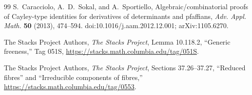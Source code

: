 \begin{thebibliography}{99}
S.~Caracciolo, A.~D.~Sokal, and A.~Sportiello,
Algebraic/combinatorial proofs of Cayley-type identities for derivatives
of determinants and pfaffians,
\emph{Adv. Appl. Math.} \textbf{50} (2013), 474--594.
doi:10.1016/j.aam.2012.12.001; arXiv:1105.6270.

The Stacks Project Authors,
\emph{The Stacks Project}, Lemma 10.118.2, ``Generic freeness,''
Tag 051S, \url{https://stacks.math.columbia.edu/tag/051S}.

The Stacks Project Authors,
\emph{The Stacks Project}, Sections 37.26--37.27,
``Reduced fibres'' and ``Irreducible components of fibres,''
\url{https://stacks.math.columbia.edu/tag/0553}.

\end{thebibliography}
